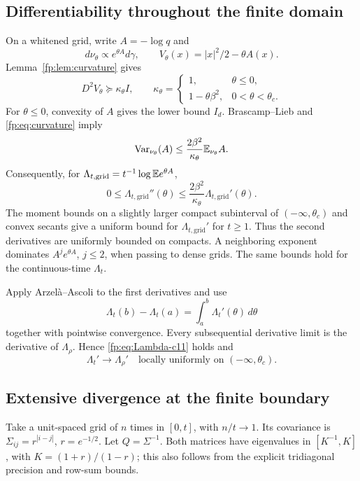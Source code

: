 \subsection{Differentiability throughout the finite domain}
On a whitened grid, write $A=-\log q$ and
\[
 d\nu_\theta\propto e^{\theta A}d\gamma,
 \qquad V_\theta(x)=|x|^2/2-\theta A(x).
\]
Lemma~\ref{fp:lem:curvature} gives
\begin{equation}\label{fp:eq:kappa-theta}
 D^2V_\theta\succeq\kappa_\theta I,\qquad
 \kappa_\theta=
 \begin{cases}
 1,&\theta\le0,\\
 1-\theta\beta^2,&0<\theta<\theta_c.
 \end{cases}
\end{equation}
For $\theta\le0$, convexity of $A$ gives the lower bound $I_d$. Brascamp--Lieb and \eqref{fp:eq:curvature} imply
\[
 \operatorname{Var}_{\nu_\theta}(A)
 \le\frac{2\beta^2}{\kappa_\theta}\mathbb E_{\nu_\theta}A.
\]
Consequently, for $\Lambda_{t,\mathrm{grid}}=t^{-1}\log\mathbb E e^{\theta A}$,
\begin{equation}\label{fp:eq:Lambda-curvature}
 0\le\Lambda_{t,\mathrm{grid}}''(\theta)
 \le\frac{2\beta^2}{\kappa_\theta}
       \Lambda_{t,\mathrm{grid}}'(\theta).
\end{equation}
The moment bounds on a slightly larger compact subinterval of $(-\infty,\theta_c)$ and convex secants give a uniform bound for $\Lambda_{t,\mathrm{grid}}'$ for $t\ge1$. Thus the second derivatives are uniformly bounded on compacts. A neighboring exponent dominates $A^je^{\theta A}$, $j\le2$, when passing to dense grids. The same bounds hold for the continuous-time $\Lambda_t$.

Apply Arzel\`a--Ascoli to the first derivatives and use
\[
 \Lambda_t(b)-\Lambda_t(a)=\int_a^b\Lambda_t'(\theta)\,d\theta
\]
together with pointwise convergence. Every subsequential derivative limit is the derivative of $\Lambda_\rho$. Hence \eqref{fp:eq:Lambda-c11} holds and
\begin{equation}\label{fp:eq:Lambda-derivative-limit}
 \Lambda_t'\longrightarrow\Lambda_\rho'
 \quad\text{locally uniformly on }(-\infty,\theta_c).
\end{equation}

\subsection{Extensive divergence at the finite boundary}
\label{fp:subsec:boundary-divergence}
Take a unit-spaced grid of $n$ times in $[0,t]$, with $n/t\to1$. Its covariance is $\Sigma_{ij}=r^{|i-j|}$, $r=e^{-1/2}$. Let $Q=\Sigma^{-1}$. Both matrices have eigenvalues in $[K^{-1},K]$, with $K=(1+r)/(1-r)$; this also follows from the explicit tridiagonal precision and row-sum bounds.

